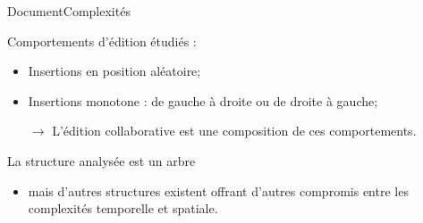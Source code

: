 \begin{frame}{Document}{Complexités}

  \begin{minipage}{0.45\textwidth}
    \begin{center}
      
    \end{center}
  \end{minipage}
  \hfill
  \begin{minipage}{0.45\textwidth}
    \begin{center}
      
    \end{center}
  \end{minipage}

  \vspace{0.5cm}
  
  Comportements d'édition étudiés :
  \begin{itemize}
  \item Insertions en position
    aléatoire; %
  \item Insertions monotone : de gauche à droite ou de droite à gauche;
  \item [$\rightarrow$] L'édition collaborative est une composition de ces
    comportements.
  \end{itemize}
  

  \vspace{0.5cm}
  
  La structure analysée est un arbre 
  \begin{itemize}
  \item mais d'autres structures existent offrant d'autres compromis entre les
    complexités temporelle et spatiale.
  \end{itemize}

\end{frame}

